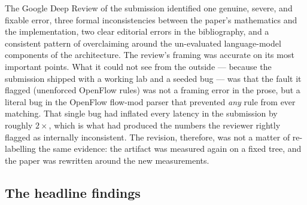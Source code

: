 \documentclass[11pt,a4paper]{article}
\begin{document}
The Google Deep Review of the submission identified one genuine, severe, and
fixable error, three formal inconsistencies between the paper's mathematics and
the implementation, two clear editorial errors in the bibliography, and a
consistent pattern of overclaiming around the un-evaluated language-model
components of the architecture. The review's framing was accurate on its most
important points. What it could not see from the outside --- because the
submission shipped with a working lab and a seeded bug --- was that the fault it
flagged (unenforced OpenFlow rules) was not a framing error in the prose, but a
literal bug in the OpenFlow flow-mod parser that prevented \emph{any} rule from
ever matching. That single bug had inflated every latency in the submission by
roughly $2\times$, which is what had produced the numbers the reviewer rightly
flagged as internally inconsistent. The revision, therefore, was not a matter of
re-labelling the same evidence: the artifact was measured again on a fixed tree,
and the paper was rewritten around the new measurements.

\subsection{The headline findings}
\end{document}
